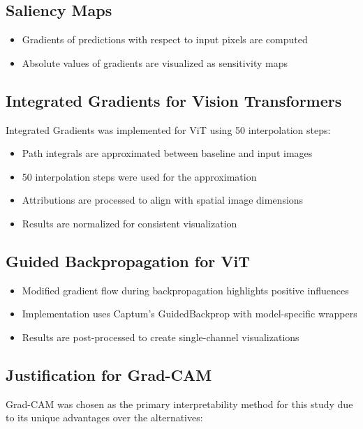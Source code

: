 \documentclass[a4paper,12pt]{report}
\begin{document}
\subsection{Saliency Maps}

\begin{itemize}
\item Gradients of predictions with respect to input pixels are computed
\item Absolute values of gradients are visualized as sensitivity maps
\end{itemize}

\subsection{Integrated Gradients for Vision Transformers}

Integrated Gradients was implemented for ViT using 50 interpolation steps:

\begin{itemize}
    \item Path integrals are approximated between baseline and input images
    \item 50 interpolation steps were used for the approximation
    \item Attributions are processed to align with spatial image dimensions
    \item Results are normalized for consistent visualization
\end{itemize}

\subsection{Guided Backpropagation for ViT}

\begin{itemize}
    \item Modified gradient flow during backpropagation highlights positive influences
    \item Implementation uses Captum's GuidedBackprop with model-specific wrappers
    \item Results are post-processed to create single-channel visualizations
\end{itemize}


\subsection{Justification for Grad-CAM}

Grad-CAM was chosen as the primary interpretability method for this study due to its unique advantages over the alternatives:
\end{document}
